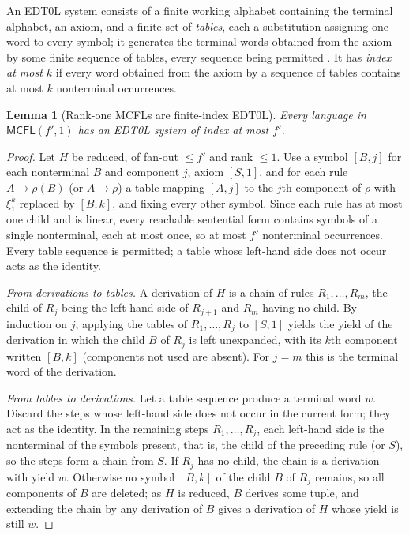 \documentclass[11pt]{article}
\numberwithin{equation}{section}
\theoremstyle{plain}
\newtheorem{lemma}[theorem]{Lemma}
\theoremstyle{definition}
\theoremstyle{remark}
\theoremstyle{plain}
\begin{document}
An EDT0L system consists of a finite working alphabet containing the
terminal alphabet, an axiom, and a finite set of \emph{tables}, each a
substitution assigning one word to every symbol; it generates the terminal
words obtained from the axiom by some finite sequence of tables, every
sequence being permitted \cite[Definition~37]{Gallot2021}.  It has
\emph{index at most $k$} if every word obtained from the axiom by a sequence
of tables contains at most $k$ nonterminal occurrences.

\begin{lemma}[Rank-one MCFLs are finite-index EDT0L]
\label{lem:rank-one-edt0l}
Every language in $\mathsf{MCFL}(f',1)$ has an EDT0L system of index at most $f'$.
\end{lemma}

\begin{proof}
Let $H$ be reduced, of fan-out $\le f'$ and rank $\le1$.  Use a symbol $[B,j]$ for each
nonterminal $B$ and component $j$, axiom $[S,1]$, and for each rule $A\to\rho(B)$ (or
$A\to\rho$) a table mapping $[A,j]$ to the $j$th component of $\rho$ with $\xi_1^k$
replaced by $[B,k]$, and fixing every other symbol.  Since each rule has at most one
child and is linear, every reachable sentential form contains symbols of a single
nonterminal, each at most once, so at most $f'$ nonterminal occurrences.  Every
table sequence is permitted; a table whose left-hand side does not occur acts as the
identity.

\emph{From derivations to tables.}  A derivation of $H$ is a chain of rules
$R_1,\ldots,R_m$, the child of $R_j$ being the left-hand side of $R_{j+1}$ and $R_m$
having no child.  By induction on $j$, applying the tables of $R_1,\ldots,R_j$ to
$[S,1]$ yields the yield of the derivation in which the child $B$ of $R_j$ is left
unexpanded, with its $k$th component written $[B,k]$ (components not used are
absent).  For $j=m$ this is the terminal word of the derivation.

\emph{From tables to derivations.}  Let a table sequence produce a terminal word $w$.
Discard the steps whose left-hand side does not occur in the current form; they act
as the identity.  In the remaining steps $R_1,\ldots,R_j$, each left-hand side is the
nonterminal of the symbols present, that is, the child of the preceding rule (or $S$),
so the steps form a chain from $S$.  If $R_j$ has no child, the chain is a
derivation with yield $w$.  Otherwise no symbol $[B,k]$ of the child $B$ of $R_j$
remains, so all components of $B$ are deleted; as $H$ is reduced, $B$ derives some
tuple, and extending the chain by any derivation of $B$ gives a derivation of $H$
whose yield is still $w$.
\end{proof}
\end{document}
